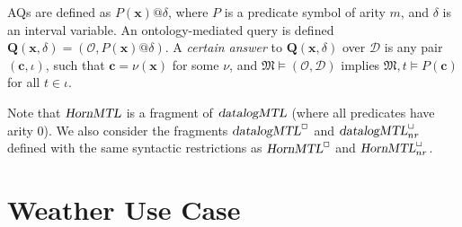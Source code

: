 \documentclass{article}
\newcommand{\Mmf}{\mathfrak{M}}
\newcommand{\avec}[1]{\boldsymbol{#1}}
\newcommand{\omq}{\boldsymbol Q}
\newcommand{\D}{\mathcal{D}}
\renewcommand{\O}{\mathcal{O}}
\newcommand{\hMTL}{\textsl{HornMTL}}
\newcommand{\dMTL}{\textsl{datalogMTL}}
\begin{document}
{{  AQs are defined as $P(\avec{x})@\delta$, where $P$ is a predicate symbol of
  arity $m$, and $\delta$ is an interval
  variable. An ontology-mediated query is defined
  $\omq(\avec{x}, \delta) = (\O,P(\avec{x})@\delta)$. A \emph{certain
    answer} to $\omq(\avec{x},\delta)$ over $\D$ is any pair
  $(\avec{c}, \iota)$, such that $\avec{c} = \nu(\avec{x})$ for some
  $\nu$, and $\Mmf \models (\O, \D)$ implies
  $\Mmf, t \models P(\avec{c})$ for all $t \in \iota$.

Note that $\hMTL$ is a fragment of $\dMTL$ (where all predicates have arity $0$). We also consider the fragments $\dMTL^\Box$ and $\dMTL^\Box_{nr}$ defined with the same syntactic restrictions as $\hMTL^\Box$ and $\hMTL^\Box_{nr}$.

\section{Weather Use Case}

}}
\end{document}
